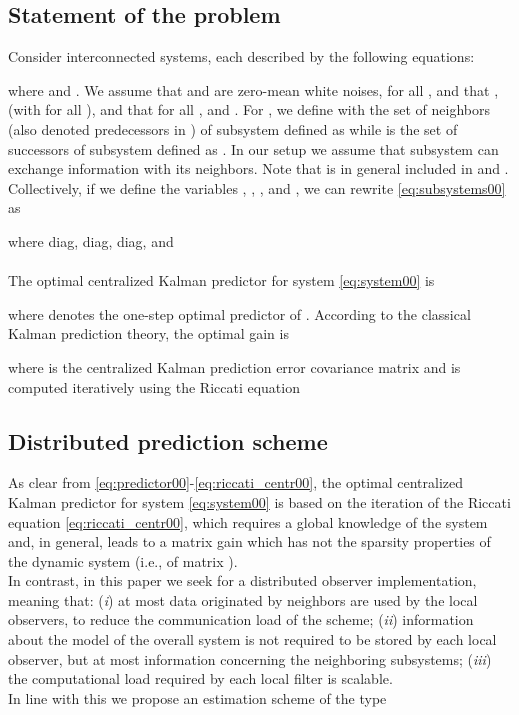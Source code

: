 \documentclass[journal,10pt,draftcls,onecolumn]{IEEEtran}
\begin{document}
\subsection{Statement of the problem}
Consider  interconnected systems, each described by the following equations:

where  and .
We assume that  and  are zero-mean white noises, for all , and that ,  (with  for all ), and that  for all , and . For , we define with  the set of neighbors (also denoted predecessors in \cite{RiversoFarinaGFT_PnP13}) of subsystem  defined as  while  is the set of successors of subsystem  defined as . In our setup we assume that subsystem  can exchange information with its neighbors. Note that  is in general included in  and .\\
Collectively, if we define the variables , , , and , we can rewrite \eqref{eq:subsystems00} as

where diag, diag, diag, and\\
\\
The optimal centralized Kalman predictor \cite{GoodwinRiccati-84} for system \eqref{eq:system00} is

where  denotes the one-step optimal predictor of . According to the classical Kalman prediction theory, the optimal gain is

where  is the centralized Kalman prediction error covariance matrix and is computed iteratively using the Riccati equation

\subsection{Distributed prediction scheme}
As clear from \eqref{eq:predictor00}-\eqref{eq:riccati_centr00}, the optimal centralized Kalman predictor for system \eqref{eq:system00} is based on the iteration of the Riccati equation \eqref{eq:riccati_centr00}, which requires a global knowledge of the system and, in general, leads to a matrix gain which has not the sparsity properties of the dynamic system (i.e., of matrix ).\\
In contrast, in this paper we seek for a distributed observer implementation, meaning that: (\emph{i}) at most data originated by neighbors are used by the local observers, to reduce the communication load of the scheme; (\emph{ii}) information about the model of the overall system is not required to be stored by each local observer, but at most information concerning the neighboring subsystems; (\emph{iii}) the computational load required by each local filter is scalable.\\
In line with this we propose an estimation scheme of the type
\end{document}
